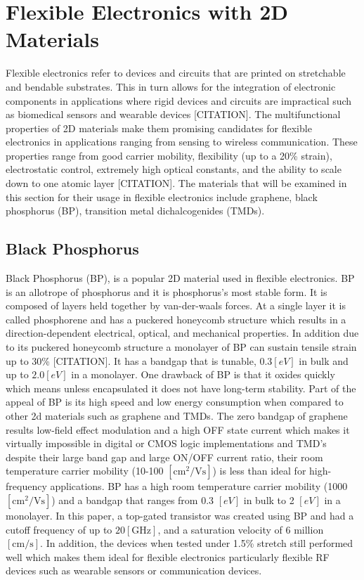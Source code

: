 \documentclass[conference]{IEEEtran}
\begin{document}
\section{Flexible Electronics with 2D Materials}

Flexible electronics refer to devices and circuits that are printed on stretchable and bendable substrates. This in turn allows for the integration of electronic components in applications where rigid devices and circuits are impractical such as biomedical sensors and wearable devices [CITATION]. The multifunctional properties of 2D materials make them promising candidates for flexible electronics in applications ranging from sensing to wireless communication. These properties range from good carrier mobility, flexibility (up to a 20\% strain), electrostatic control, extremely high optical constants, and the ability to scale down to one atomic layer [CITATION]. The materials that will be examined in this section for their usage in flexible electronics include graphene, black phosphorus (BP), transition metal dichalcogenides (TMDs).

\subsection{Black Phosphorus}

Black Phosphorus (BP), is a popular 2D material used in flexible electronics. BP is an allotrope of phosphorus and it is phosphorus's most stable form. It is composed of layers held together by van-der-waals forces. At a single layer it is called phosphorene and has a puckered honeycomb structure which results in a direction-dependent electrical, optical, and mechanical properties. In addition due to its puckered honeycomb structure a monolayer of BP can sustain tensile strain up to 30\% [CITATION]. It has a bandgap that is tunable, 0.3$[\si{eV}]$ in bulk and up to $2.0[\si{eV}]$ in a monolayer. One drawback of BP is that it oxides quickly which means unless encapsulated it does not have long-term stability. Part of the appeal of BP is its high speed and low energy consumption when compared to other 2d materials such as graphene and TMDs. The zero bandgap of graphene results low-field effect modulation and a high OFF state current which makes it virtually impossible in digital or CMOS logic implementations and TMD’s despite their large band gap and large ON/OFF current ratio, their room temperature carrier mobility (10-100 $[\si{\centi\meter\squared\per\volt\second}]$)  is less than ideal for high-frequency applications. BP has a high room temperature carrier mobility (1000 $[\si{\centi\meter\squared\per\volt\second}]$) and a bandgap that ranges from 0.3 $[\si{eV}]$ in bulk to 2 $[\si{eV}]$ in a monolayer. In this paper, a top-gated transistor was created using BP and had a cutoff frequency of up to $20 [\si{\giga\hertz}]$, and a saturation velocity of 6 million $[\si{\centi\meter\per\second}]$. In addition, the devices when tested under 1.5\% stretch still performed well which makes them ideal for flexible electronics particularly flexible RF devices such as wearable sensors or communication devices.
\end{document}
